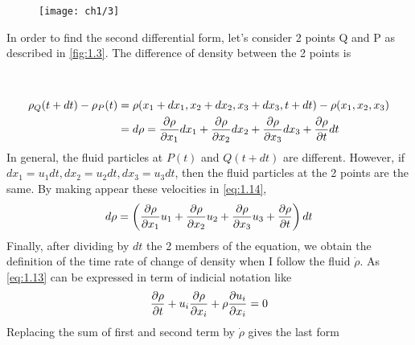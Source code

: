 	\begin{figure}
	\vspace{-5mm}
	\texttt{[image: ch1/3]}
	\label{fig:1.3}
	\end{figure}
	In order to find the second differential form, let's consider 2 points Q and P as described in \autoref{fig:1.3}. The difference of density between the 2 points is \\\\\\
	\begin{equation}
	\begin{aligned}
		\rho _Q(t+dt) - \rho _P(t) &= \rho (x_1+dx_1,x_2+dx_2,x_3+dx_3,t+dt) - \rho (x_1,x_2,x_3)  \\
		&= d\rho = \frac{\partial \rho}{\partial x_1}dx_1 + \frac{\partial \rho}{\partial x_2}dx_2 + \frac{\partial \rho}{\partial x_3}dx_3 + \frac{\partial \rho}{\partial t}dt
		\end{aligned}
		\label{eq:1.14}
	\end{equation}
	In general, the fluid particles at $P(t)$ and $Q(t+dt)$ are different. However, if $dx_1 = u_1 dt, dx_2 = u_2 dt, dx_3 = u_3 dt$, then the fluid particles at the 2 points are the same. By making appear these velocities in \eqref{eq:1.14}, 
	\begin{equation}
		d\rho = \left( \frac{\partial \rho}{\partial x_1}u_1 + \frac{\partial \rho}{\partial x_2}u_2 + \frac{\partial \rho}{\partial x_3}u_3 + \frac{\partial \rho}{\partial t}\right) dt
	\end{equation}
	Finally, after dividing by $dt$ the 2 members of the equation, we obtain the definition of the time rate of change of density when I follow the fluid $\dot{\rho}$. As \eqref{eq:1.13} can be expressed in term of indicial notation like 
	\begin{equation}
		\frac{\partial \rho}{\partial t} + u_i \frac{\partial\rho}{\partial x_i} + \rho \frac{\partial u_i}{\partial x_i} = 0 
	\end{equation}
	Replacing the sum of first and second term by $\dot{\rho}$ gives the last form
	\begin{center}
	\end{center}
	
